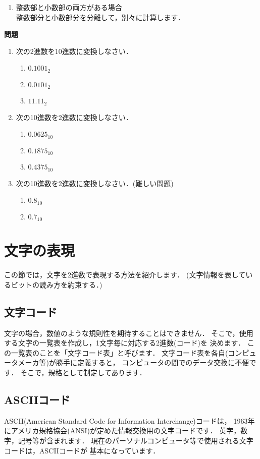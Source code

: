 \begin{enumerate}
\item 整数部と小数部の両方がある場合 \\
整数部分と小数部分を分離して，別々に計算します．
\end{enumerate}

\begin{flushleft}
{\bf 問題}
\end{flushleft}
\begin{enumerate}
\item
次の2進数を10進数に変換しなさい．
\begin{enumerate}
\item $0.1001_2$
\item $0.0101_2$
\item $11.11_2$
\end{enumerate}
\item
次の10進数を2進数に変換しなさい．
\begin{enumerate}
\item $0.0625_{10}$
\item $0.1875_{10}$
\item $0.4375_{10}$
\end{enumerate}
\item
次の10進数を2進数に変換しなさい．(難しい問題)
\begin{enumerate}
\item $0.8_{10}$
\item $0.7_{10}$
\end{enumerate}
\end{enumerate}

\section{文字の表現}
\label{char}

この節では，文字を2進数で表現する方法を紹介します．
(文字情報を表しているビットの読み方を約束する．)

\subsection{文字コード}
文字の場合，数値のような規則性を期待することはできません．
そこで，使用する文字の一覧表を作成し，1文字毎に対応する2進数(コード)を
決めます．
この一覧表のことを「文字コード表」と呼びます．
文字コード表を各自(コンピュータメーカ等)が勝手に定義すると，
コンピュータの間でのデータ交換に不便です．
そこで，規格として制定してあります．

\subsection{ASCIIコード}
\label{ascii}
ASCII(American Standard Code for Information Interchange)コードは，
1963年にアメリカ規格協会(ANSI)が定めた情報交換用の文字コードです．
英字，数字，記号等が含まれます．
現在のパーソナルコンピュータ等で使用される文字コードは，ASCIIコードが
基本になっています．

